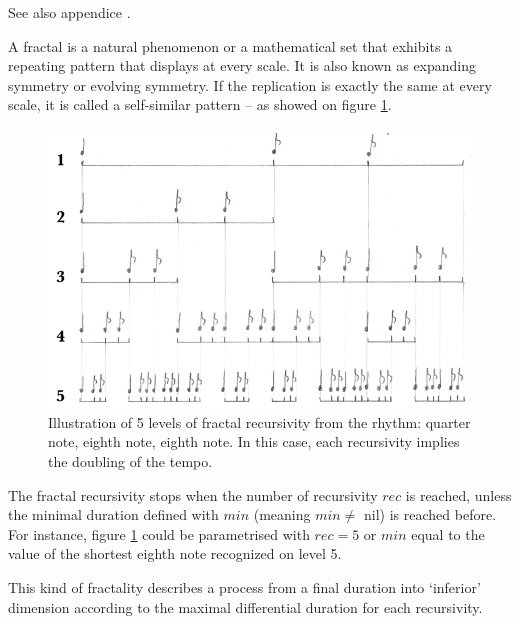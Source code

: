 \label{imp3}

See also appendice . 

{A fractal is a natural phenomenon or a mathematical set that exhibits a repeating pattern that displays at every scale. It is also known as expanding symmetry or evolving symmetry. If the replication is exactly the same at every scale, it is called a self-similar pattern -- as showed on figure \ref{fractal}. 

 }
 
\begin{figure}[H]
\begin{center}
\includegraphics[width=\textwidth]{img/1548}
\caption{Illustration of 5 levels of fractal recursivity from the rhythm: quarter note, eighth note, eighth note. In this case, each recursivity implies the doubling of the tempo.}
\label{fractal}
\end{center}
\end{figure}



The fractal recursivity stops when the number of recursivity $rec$ is reached, unless the minimal duration defined with $min$ (meaning $min \ne$ nil) is reached before. For instance, figure \ref{fractal} could be parametrised with $rec=5$ or $min$ equal to the value of the shortest eighth note recognized on level 5. 

\bigskip 
This kind of fractality describes a process from a final duration into `inferior' dimension according to the maximal differential duration for each recursivity.  


